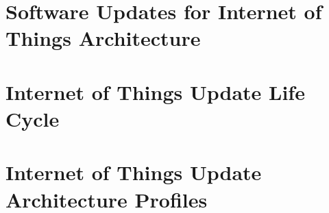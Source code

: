 \documentclass[0-thesis.tex]{subfiles}
\begin{document}
    \section{Software Updates for Internet of Things Architecture}
    

    \section{Internet of Things Update Life Cycle}
    

    \section{Internet of Things Update Architecture Profiles}
    
\end{document}

